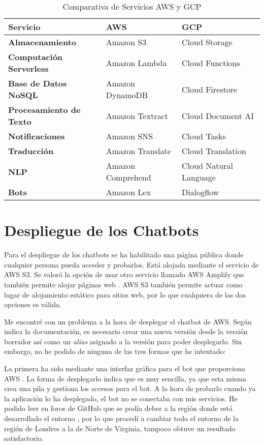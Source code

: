 \begin{table}[h]
\centering
\begin{tabularx}{\textwidth}{@{}lXX@{}}
\toprule
\textbf{Servicio} & \textbf{AWS} & \textbf{GCP} \\
\midrule
\textbf{Almacenamiento} & Amazon S3 & Cloud Storage \\
\textbf{Computación Serverless} & Amazon Lambda & Cloud Functions \\
\textbf{Base de Datos NoSQL} & Amazon DynamoDB & Cloud Firestore \\
\textbf{Procesamiento de Texto} & Amazon Textract & Cloud Document AI \\
\textbf{Notificaciones} & Amazon SNS & Cloud Tasks \\
\textbf{Traducción} & Amazon Translate & Cloud Translation \\
\textbf{NLP} & Amazon Comprehend & Cloud Natural Language \\
\textbf{Bots} & Amazon Lex & Dialogflow \\
\bottomrule
\end{tabularx}
\caption{Comparativa de Servicios AWS y GCP}
\label{tab:comparativa}
\end{table}


\section{Despliegue de los Chatbots}
Para el despliegue de los chatbots se ha habilitado una página pública donde cualquier persona pueda acceder y probarlos. Está alojada mediante el servicio de AWS S3. Se valoró la opción de usar otro servicio llamado AWS Amplify que también permite alojar páginas web \cite{awsamplify}. AWS S3 también permite actuar como lugar de alojamiento estático para sitios web, por lo que cualquiera de las dos opciones es válida.

Me encontré con un problema a la hora de desplegar el chatbot de AWS. Según indica la documentación, es necesario crear una nueva versión desde la versión borrador así como un \textit{alias} asignado a la versión para poder desplegarlo. Sin embargo, no he podido de ninguna de las tres formas que he intentado:

La primera ha sido mediante una interfaz gráfica para el bot que proporciona AWS \cite{awsblog}. La forma de desplegarlo indica que es muy sencilla, ya que esta misma crea una pila y gestiona los accesos para el bot. A la hora de probarlo cuando ya la aplicación lo ha desplegado, el bot no se conectaba con mis servicios. He podido leer en foros de GitHub que se podía deber a la región donde está desarrollado el entorno \cite{githubissue}, por lo que procedí a cambiar todo el entorno de la región de Londres a la de Norte de Virginia, tampoco obtuve un resultado satisfactorio.

